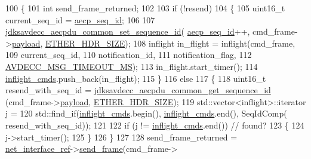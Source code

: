 \begin{DoxyCode}
100 \{
101     \textcolor{keywordtype}{int} send\_frame\_returned;
102 
103     \textcolor{keywordflow}{if} (!resend)
104     \{
105         uint16\_t current\_seq\_id = \hyperlink{classavdecc__lib_1_1aecp__controller__state__machine_a739c0b970efa6070e274e47060b7aa55}{aecp\_seq\_id};
106 
107         \hyperlink{group__aecpdu__common_gab9f7895d1c5befd0b2965510dfe66533}{jdksavdecc\_aecpdu\_common\_set\_sequence\_id}(
      \hyperlink{classavdecc__lib_1_1aecp__controller__state__machine_a739c0b970efa6070e274e47060b7aa55}{aecp\_seq\_id}++, cmd\_frame->\hyperlink{structjdksavdecc__frame_a220ad076814a31ae0163e722e523de46}{payload}, \hyperlink{namespaceavdecc__lib_a6c827b1a0d973e18119c5e3da518e65ca9512ad9b34302ba7048d88197e0a2dc0}{ETHER\_HDR\_SIZE});
108         inflight in\_flight = inflight(cmd\_frame,
109                                       current\_seq\_id,
110                                       notification\_id,
111                                       notification\_flag,
112                                       \hyperlink{namespaceavdecc__lib_a5672955abd1a38146bde28647367857ea3e235a94e9e3d91317afd7bdbb3844c1}{AVDECC\_MSG\_TIMEOUT\_MS});
113         in\_flight.start\_timer();
114         \hyperlink{classavdecc__lib_1_1aecp__controller__state__machine_a0475b054c1890c88809394d9cef2a4c0}{inflight\_cmds}.push\_back(in\_flight);
115     \}
116     \textcolor{keywordflow}{else}
117     \{
118         uint16\_t resend\_with\_seq\_id = \hyperlink{group__aecpdu__common_ga4c5015b65543e4753c336d98b63fea28}{jdksavdecc\_aecpdu\_common\_get\_sequence\_id}
      (cmd\_frame->\hyperlink{structjdksavdecc__frame_a220ad076814a31ae0163e722e523de46}{payload}, \hyperlink{namespaceavdecc__lib_a6c827b1a0d973e18119c5e3da518e65ca9512ad9b34302ba7048d88197e0a2dc0}{ETHER\_HDR\_SIZE});
119         std::vector<inflight>::iterator j =
120             std::find\_if(\hyperlink{classavdecc__lib_1_1aecp__controller__state__machine_a0475b054c1890c88809394d9cef2a4c0}{inflight\_cmds}.begin(), \hyperlink{classavdecc__lib_1_1aecp__controller__state__machine_a0475b054c1890c88809394d9cef2a4c0}{inflight\_cmds}.end(), SeqIdComp(
      resend\_with\_seq\_id));
121 
122         \textcolor{keywordflow}{if} (j != \hyperlink{classavdecc__lib_1_1aecp__controller__state__machine_a0475b054c1890c88809394d9cef2a4c0}{inflight\_cmds}.end()) \textcolor{comment}{// found?}
123         \{
124             j->start\_timer();
125         \}
126     \}
127 
128     send\_frame\_returned = \hyperlink{namespaceavdecc__lib_adb4da03bc65b7846cc240ee919bbde19}{net\_interface\_ref}->\hyperlink{classavdecc__lib_1_1net__interface__imp_ac1a430cb59bcfc3b43ed26b624db5dea}{send\_frame}(cmd\_frame->

\end{DoxyCode}
